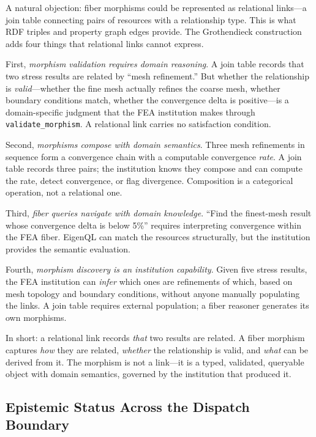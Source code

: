 \documentclass[10pt,twocolumn,letterpaper]{article}
\newcommand{\code}[1]{\texttt{\small #1}}
\begin{document}
A natural objection: fiber morphisms could be represented as relational links---a join table connecting pairs of resources with a relationship type.
This is what RDF triples and property graph edges provide.
The Grothendieck construction adds four things that relational links cannot express.

First, \emph{morphism validation requires domain reasoning}.
A join table records that two stress results are related by ``mesh refinement.''
But whether the relationship is \emph{valid}---whether the fine mesh actually refines the coarse mesh, whether boundary conditions match, whether the convergence delta is positive---is a domain-specific judgment that the FEA institution makes through \code{validate\_morphism}.
A relational link carries no satisfaction condition.

Second, \emph{morphisms compose with domain semantics}.
Three mesh refinements in sequence form a convergence chain with a computable convergence \emph{rate}.
A join table records three pairs; the institution knows they compose and can compute the rate, detect convergence, or flag divergence.
Composition is a categorical operation, not a relational one.

Third, \emph{fiber queries navigate with domain knowledge}.
``Find the finest-mesh result whose convergence delta is below 5\%'' requires interpreting convergence within the FEA fiber.
EigenQL can match the resources structurally, but the institution provides the semantic evaluation.

Fourth, \emph{morphism discovery is an institution capability}.
Given five stress results, the FEA institution can \emph{infer} which ones are refinements of which, based on mesh topology and boundary conditions, without anyone manually populating the links.
A join table requires external population; a fiber reasoner generates its own morphisms.

In short: a relational link records \emph{that} two results are related.
A fiber morphism captures \emph{how} they are related, \emph{whether} the relationship is valid, and \emph{what} can be derived from it.
The morphism is not a link---it is a typed, validated, queryable object with domain semantics, governed by the institution that produced it.

\subsection{Epistemic Status Across the Dispatch Boundary}
\end{document}

